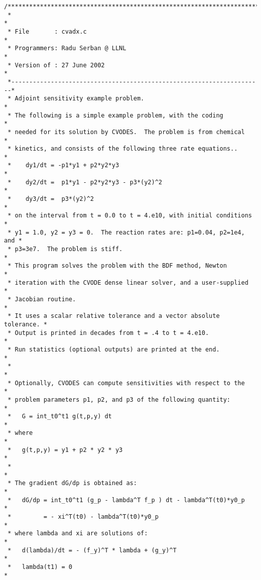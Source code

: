 \begin{verbatim}
/************************************************************************
 *                                                                      *
 * File       : cvadx.c                                                 *
 * Programmers: Radu Serban @ LLNL                                      *
 * Version of : 27 June 2002                                            *
 *----------------------------------------------------------------------*
 * Adjoint sensitivity example problem.                                 *
 * The following is a simple example problem, with the coding           *
 * needed for its solution by CVODES.  The problem is from chemical     *
 * kinetics, and consists of the following three rate equations..       *
 *    dy1/dt = -p1*y1 + p2*y2*y3                                        *
 *    dy2/dt =  p1*y1 - p2*y2*y3 - p3*(y2)^2                            *
 *    dy3/dt =  p3*(y2)^2                                               *
 * on the interval from t = 0.0 to t = 4.e10, with initial conditions   *
 * y1 = 1.0, y2 = y3 = 0.  The reaction rates are: p1=0.04, p2=1e4, and *
 * p3=3e7.  The problem is stiff.                                       *
 * This program solves the problem with the BDF method, Newton          *
 * iteration with the CVODE dense linear solver, and a user-supplied    *
 * Jacobian routine.                                                    * 
 * It uses a scalar relative tolerance and a vector absolute tolerance. *
 * Output is printed in decades from t = .4 to t = 4.e10.               *
 * Run statistics (optional outputs) are printed at the end.            *
 *                                                                      *
 * Optionally, CVODES can compute sensitivities with respect to the     *
 * problem parameters p1, p2, and p3 of the following quantity:         *
 *   G = int_t0^t1 g(t,p,y) dt                                          *
 * where                                                                *
 *   g(t,p,y) = y1 + p2 * y2 * y3                                       *
 *                                                                      *
 * The gradient dG/dp is obtained as:                                   *
 *   dG/dp = int_t0^t1 (g_p - lambda^T f_p ) dt - lambda^T(t0)*y0_p     *
 *         = - xi^T(t0) - lambda^T(t0)*y0_p                             *
 * where lambda and xi are solutions of:                                *
 *   d(lambda)/dt = - (f_y)^T * lambda + (g_y)^T                        *
 *   lambda(t1) = 0                                                     *

\end{verbatim}

